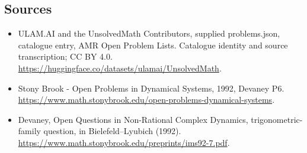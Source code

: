 \documentclass[11pt,a4paper]{article}
\begin{document}
\subsection{Sources}
\begin{itemize}
\item[S1] ULAM.AI and the UnsolvedMath Contributors, supplied problems.json, catalogue entry, AMR Open Problem Lists. Catalogue identity and source transcription; CC BY 4.0.
\url{https://huggingface.co/datasets/ulamai/UnsolvedMath}.
\item[S2] Stony Brook - Open Problems in Dynamical Systems, 1992, Devaney P6. 
\url{https://www.math.stonybrook.edu/open-problems-dynamical-systems}.
\item[S3] Devaney, Open Questions in Non-Rational Complex Dynamics, trigonometric-family question, in Bielefeld–Lyubich (1992).
\url{https://www.math.stonybrook.edu/preprints/ims92-7.pdf}.
\end{itemize}
\end{document}
